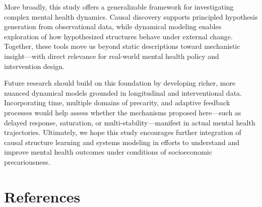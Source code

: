 \documentclass[
]{article}
\begin{document}
More broadly, this study offers a generalizable framework for
investigating complex mental health dynamics. Causal discovery supports
principled hypothesis generation from observational data, while
dynamical modeling enables exploration of how hypothesized structures
behave under external change. Together, these tools move us beyond
static descriptions toward mechanistic insight---with direct relevance
for real-world mental health policy and intervention design.

Future research should build on this foundation by developing richer,
more nuanced dynamical models grounded in longitudinal and
interventional data. Incorporating time, multiple domains of precarity,
and adaptive feedback processes would help assess whether the mechanisms
proposed here---such as delayed response, saturation, or
multi-stability---manifest in actual mental health trajectories.
Ultimately, we hope this study encourages further integration of causal
structure learning and systems modeling in efforts to understand and
improve mental health outcomes under conditions of socioeconomic
precariousness.

\section{References}\label{references}
\end{document}
